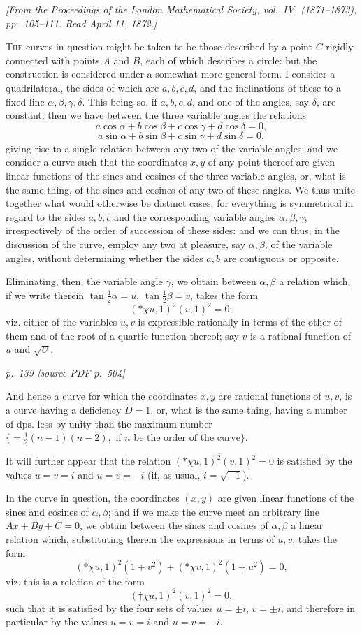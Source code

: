 \documentclass[11pt,a4paper]{article}
\newcommand{\sourcepage}[2]{%
  \bigskip
  \noindent\textit{p.~#1 [source PDF p.~#2]}%
  \par\smallskip
}
\newcommand{\fromjournal}[1]{%
  \begin{center}\textit{#1}\end{center}
}
\begin{document}
\fromjournal{[From the Proceedings of the London Mathematical Society, vol.~IV. (1871--1873), pp.~105--111. Read April 11, 1872.]}

\textsc{The} curves in question might be taken to be those described by a point $C$
rigidly connected with points $A$ and $B$, each of which describes a circle: but the
construction is considered under a somewhat more general form. I consider a
quadrilateral, the sides of which are $a,b,c,d$, and the inclinations of these to a
fixed line $\alpha,\beta,\gamma,\delta$. This being so, if $a,b,c,d$, and one of the
angles, say $\delta$, are constant, then we have between the three variable angles the
relations
\[
a\cos\alpha+b\cos\beta+c\cos\gamma+d\cos\delta=0,
\]
\[
a\sin\alpha+b\sin\beta+c\sin\gamma+d\sin\delta=0,
\]
giving rise to a single relation between any two of the variable angles; and we
consider a curve such that the coordinates $x,y$ of any point thereof are given
linear functions of the sines and cosines of the three variable angles, or, what is the
same thing, of the sines and cosines of any two of these angles. We thus unite
together what would otherwise be distinct cases; for everything is symmetrical in
regard to the sides $a,b,c$ and the corresponding variable angles
$\alpha,\beta,\gamma$, irrespectively of the order of succession of these sides: and
we can thus, in the discussion of the curve, employ any two at pleasure, say
$\alpha,\beta$, of the variable angles, without determining whether the sides $a,b$
are contiguous or opposite.

Eliminating, then, the variable angle $\gamma$, we obtain between $\alpha,\beta$ a
relation which, if we write therein $\tan\frac12\alpha=u$,
$\tan\frac12\beta=v$, takes the form
\[
({*}\chi u,1)^2(v,1)^2=0;
\]
viz. either of the variables $u,v$ is expressible rationally in terms of the other of
them and of the root of a quartic function thereof; say $v$ is a rational function of
$u$ and $\sqrt U$.

\sourcepage{139}{504}
And hence a curve for which the coordinates $x,y$ are rational functions of $u,v$,
is a curve having a deficiency $D=1$, or, what is the same thing, having a number
of dps. less by unity than the maximum number
$\{=\frac12(n-1)(n-2),\text{ if }n\text{ be the order of the curve}\}$.

It will further appear that the relation $({*}\chi u,1)^2(v,1)^2=0$ is satisfied by
the values $u=v=i$ and $u=v=-i$ (if, as usual, $i=\sqrt{-1}$).

In the curve in question, the coordinates $(x,y)$ are given linear functions of the
sines and cosines of $\alpha,\beta$; and if we make the curve meet an arbitrary line
$Ax+By+C=0$, we obtain between the sines and cosines of $\alpha,\beta$ a linear
relation which, substituting therein the expressions in terms of $u,v$, takes the form
\[
({*}\chi u,1)^2(1+v^2)+({*}\chi v,1)^2(1+u^2)=0,
\]
viz. this is a relation of the form
\[
({\dagger}\chi u,1)^2(v,1)^2=0,
\]
such that it is satisfied by the four sets of values $u=\pm i$, $v=\pm i$, and
therefore in particular by the values $u=v=i$ and $u=v=-i$.
\end{document}
